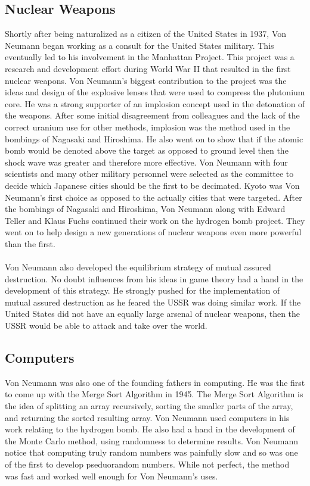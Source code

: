 \documentclass[12pt]{article}
\begin{document}
\subsection*{Nuclear Weapons}
	Shortly after being naturalized as a citizen of the United States in 1937, Von Neumann began working as a consult for the United States military. This eventually led to his involvement in the Manhattan Project. This project was a research and development effort during World War II that resulted in the first nuclear weapons. Von Neumann's biggest contribution to the project was the ideas and design of the explosive lenses that were used to compress the plutonium core. 
	He was a strong supporter of an implosion concept used in the detonation of the weapons. After some initial disagreement from colleagues and the lack of the correct uranium use for other methods, implosion was the method used in the bombings of Nagasaki and Hiroshima. He also went on to show that if the atomic bomb would be denoted above the target as opposed to ground level then the shock wave was greater and therefore more effective. Von Neumann with four scientists and many other military personnel were selected as the committee to decide which Japanese cities should be the first to be decimated. Kyoto was Von Neumann's first choice as opposed to the actually cities that were targeted.
	After the bombings of Nagasaki and Hiroshima, Von Neumann along with Edward Teller and Klaus Fuchs continued their work on the hydrogen bomb project. They went on to help design a new generations of nuclear weapons even more powerful than the first. \\
	\\
	Von Neumann also developed the equilibrium strategy of mutual assured destruction. No doubt influences from his ideas in game theory had a hand in the development of this strategy. He strongly pushed for the implementation of mutual assured destruction as he feared the USSR was doing similar work. If the United States did not have an equally large arsenal of nuclear weapons, then the USSR would be able to attack and take over the world.
\subsection*{Computers}
Von Neumann was also one of the founding fathers in computing. He was the first to come up with the Merge Sort Algorithm in 1945. The Merge Sort Algorithm is the idea of splitting an array recursively, sorting the smaller parts of the array, and returning the sorted resulting array. Von Neumann used computers in his work relating to the hydrogen bomb. He also had a hand in the development of the Monte Carlo method, using randomness to determine results. Von Neumann notice that computing truly random numbers was painfully slow and so was one of the first to develop pseduorandom numbers. While not perfect, the method was fast and worked well enough for Von Neumann's uses. 
\end{document}
